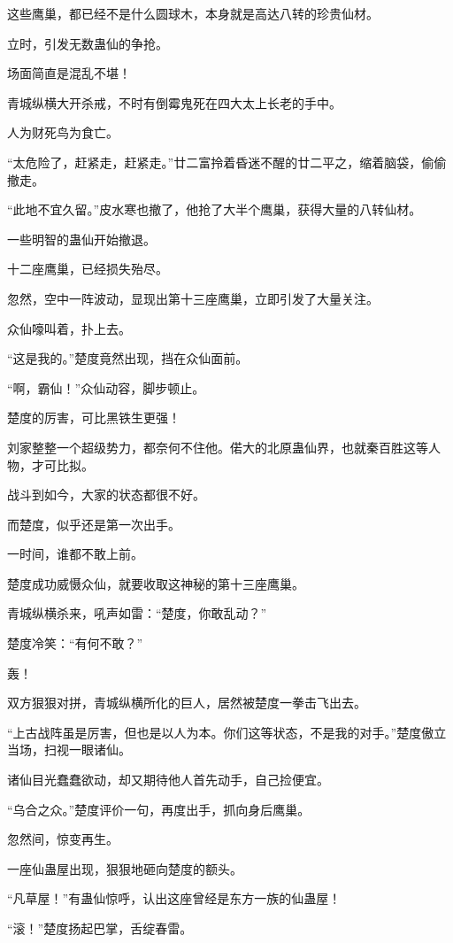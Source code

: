 \begin{this_body}
这些鹰巢，都已经不是什么圆球木，本身就是高达八转的珍贵仙材。

立时，引发无数蛊仙的争抢。

场面简直是混乱不堪！

青城纵横大开杀戒，不时有倒霉鬼死在四大太上长老的手中。

人为财死鸟为食亡。

“太危险了，赶紧走，赶紧走。”廿二富拎着昏迷不醒的廿二平之，缩着脑袋，偷偷撤走。

“此地不宜久留。”皮水寒也撤了，他抢了大半个鹰巢，获得大量的八转仙材。

一些明智的蛊仙开始撤退。

十二座鹰巢，已经损失殆尽。

忽然，空中一阵波动，显现出第十三座鹰巢，立即引发了大量关注。

众仙嚎叫着，扑上去。

“这是我的。”楚度竟然出现，挡在众仙面前。

“啊，霸仙！”众仙动容，脚步顿止。

楚度的厉害，可比黑铁生更强！

刘家整整一个超级势力，都奈何不住他。偌大的北原蛊仙界，也就秦百胜这等人物，才可比拟。

战斗到如今，大家的状态都很不好。

而楚度，似乎还是第一次出手。

一时间，谁都不敢上前。

楚度成功威慑众仙，就要收取这神秘的第十三座鹰巢。

青城纵横杀来，吼声如雷：“楚度，你敢乱动？”

楚度冷笑：“有何不敢？”

轰！

双方狠狠对拼，青城纵横所化的巨人，居然被楚度一拳击飞出去。

“上古战阵虽是厉害，但也是以人为本。你们这等状态，不是我的对手。”楚度傲立当场，扫视一眼诸仙。

诸仙目光蠢蠢欲动，却又期待他人首先动手，自己捡便宜。

“乌合之众。”楚度评价一句，再度出手，抓向身后鹰巢。

忽然间，惊变再生。

一座仙蛊屋出现，狠狠地砸向楚度的额头。

“凡草屋！”有蛊仙惊呼，认出这座曾经是东方一族的仙蛊屋！

“滚！”楚度扬起巴掌，舌绽春雷。


\end{this_body}

